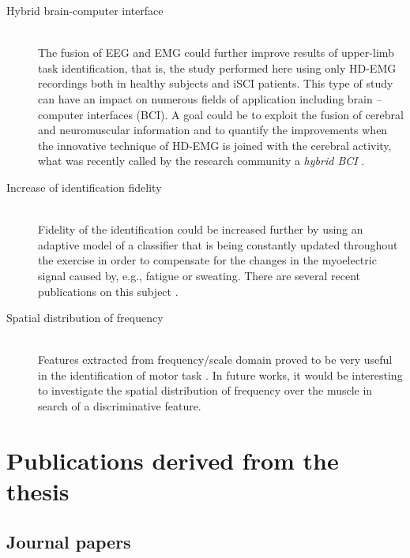 \begin{description}
\item[Hybrid brain-computer interface] \hfill \\
	The fusion of EEG and EMG could further improve results of upper-limb task identification, that is, the study performed here using only HD-EMG recordings both in healthy subjects and iSCI patients. This type of study can have an impact on numerous fields of application including brain – computer interfaces (BCI). A goal could be to exploit the fusion of cerebral and neuromuscular information and to quantify the improvements when the innovative technique of HD-EMG is joined with the cerebral activity, what was recently called by the research community a \emph{hybrid BCI} \citep{Muller-Putz2015, Rohm2013}.

\item [Increase of identification fidelity] \hfill \\
	Fidelity of the identification could be increased further by using an adaptive model of a classifier that is being constantly updated throughout the exercise in order to compensate for the changes in the myoelectric signal caused by, e.g., fatigue or sweating. There are several recent publications on this subject \citep{Hahne2015, Vidovic2016, Sensinger2009}.

\item[Spatial distribution of frequency] \hfill \\
	Features extracted from frequency/scale domain proved to be very useful in the identification of motor task \citep{Oskoei2007}. In future works, it would be interesting to investigate the spatial distribution of frequency over the muscle in search of a discriminative feature.

\end{description}

\section {Publications derived from the thesis}
\subsection{Journal papers}

